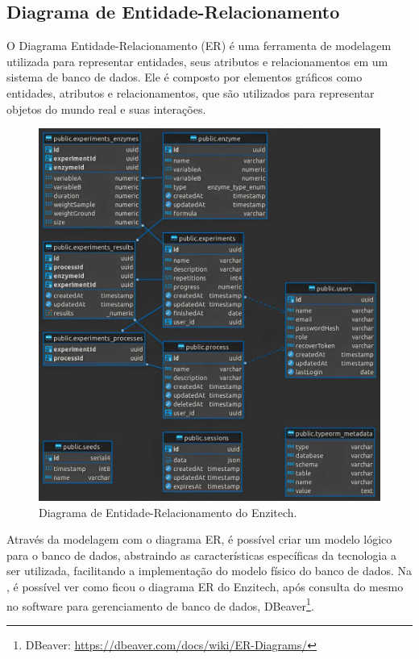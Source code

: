 \subsection{Diagrama de Entidade-Relacionamento}
O Diagrama Entidade-Relacionamento (ER) é uma ferramenta de modelagem utilizada para representar entidades, seus atributos e relacionamentos em um sistema de banco de dados. Ele é composto por elementos gráficos como entidades, atributos e relacionamentos, que são utilizados para representar objetos do mundo real e suas interações.

% 

\begin{figure}[H]
\centering
  \includegraphics[scale=0.29]{images/er.pdf}
  \caption{Diagrama de Entidade-Relacionamento do Enzitech.}
  \label{fig:der}
\end{figure}

Através da modelagem com o diagrama ER, é possível criar um modelo lógico para o banco de dados, abstraindo as características específicas da tecnologia a ser utilizada, facilitando a implementação do modelo físico do banco de dados. Na , é possível ver como ficou o diagrama ER do Enzitech, após consulta do mesmo no software para gerenciamento de banco de dados, DBeaver\footnote{\label{dbeaver}DBeaver: \url{https://dbeaver.com/docs/wiki/ER-Diagrams/}}.

